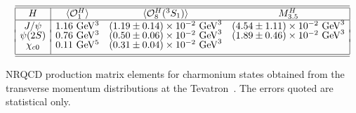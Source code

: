 \begin{table}
\begin{center}
\renewcommand{\arraystretch}{1.5}
$$
\begin{array}{|c|ccc|}
\hline\hline
 H & \langle {\cal{O}}_1^{H} \rangle  & \langle
 {\cal{O}}^{H}_8({}^3S_1) \rangle  &
 M_{3.5}^{H}\\ \hline
 J/\psi   & 1.16~{\rm GeV^3} & (1.19 \pm 0.14)\times 10^{-2}~{\rm GeV}^3 &  
 (4.54 \pm 1.11)\times 10^{-2}~{\rm GeV}^3 \\[-1mm] 
 \psi(2S) & 0.76~{\rm GeV^3} & (0.50 \pm 0.06)\times 10^{-2}~{\rm GeV}^3 & 
 (1.89 \pm 0.46)\times 10^{-2}~{\rm GeV}^3 
 \\[-1mm]
 \chi_{c0} & 0.11~{\rm GeV^5} & (0.31 \pm 0.04)\times 10^{-2}~{\rm GeV}^3 & 
 \\[1mm] \hline \hline
\end{array}
$$
\renewcommand{\arraystretch}{1.0}
\caption{NRQCD production matrix elements for charmonium states
obtained from the transverse momentum distributions at the
Tevatron~\cite{Kramer:2001hh}. The errors quoted are statistical
only.}
\label{tab:me-1}
\end{center}
\end{table}

